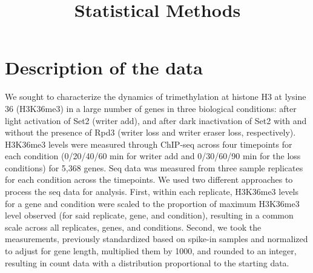 \documentclass[12pt]{extarticle}
\title{Statistical Methods}
\date{}
\begin{document}
\maketitle

\section*{Description of the data}
We sought to characterize the dynamics of trimethylation at histone H3 at lysine 36 (H3K36me3) in a large number of genes in three biological conditions: after light activation of Set2 (writer add), and after dark inactivation of Set2 with and without the presence of Rpd3 (writer loss and writer eraser loss, respectively). H3K36me3 levels were measured through ChIP-seq across four timepoints for each condition (0/20/40/60 min for writer add and 0/30/60/90 min for the loss conditions) for 5,368 genes. Seq data was measured from three sample replicates for each condition across the timepoints. We used two different approaches to process the seq data for analysis. First, within each replicate, H3K36me3 levels for a gene and condition were scaled to the proportion of maximum H3K36me3 level observed (for said replicate, gene, and condition), resulting in a common scale across all replicates, genes, and conditions. Second, we took the measurements, previously standardized based on spike-in samples and normalized to adjust for gene length, multiplied them by 1000, and rounded to an integer, resulting in count data with a distribution proportional to the starting data. 
\end{document}

